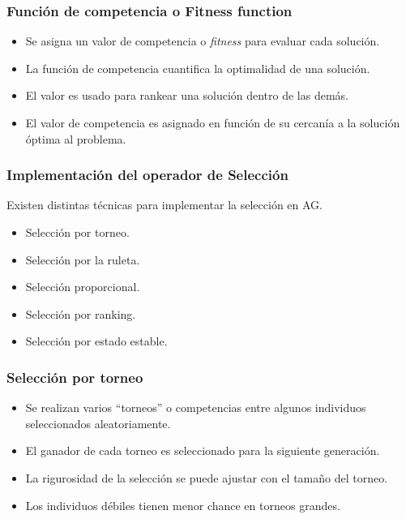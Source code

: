 \documentclass[10pt]{beamer}
\begin{document}
\begin{frame}
  \frametitle{Función de competencia o Fitness function}
  \begin{itemize}
    \item Se asigna un valor de competencia o \textit{fitness} para evaluar cada solución.
    \item La función de competencia cuantifica la optimalidad de una solución.
    \item El valor es usado para rankear una solución dentro de las demás.
    \item El valor de competencia es asignado en función de su cercanía a la solución óptima al problema.
  \end{itemize}

\end{frame}

\begin{frame}
  \frametitle{Implementación del operador de Selección}
  Existen distintas técnicas para implementar la selección en AG.
  \begin{itemize}
    \item Selección por torneo.
    \item Selección por la ruleta.
    \item Selección proporcional.
    \item Selección por ranking.
    \item Selección por estado estable.
  \end{itemize}
\end{frame}

\begin{frame}
  \frametitle{Selección por torneo}

  \begin{itemize}
    \item Se realizan varios  ``torneos'' o competencias entre algunos individuos seleccionados aleatoriamente.
    \item El ganador de cada torneo es seleccionado para la siguiente generación.
    \item La rigurosidad de la selección se puede ajustar con el tamaño del torneo.
    \item Los individuos débiles tienen menor chance en torneos grandes.
  \end{itemize}

\end{frame}
\end{document}
